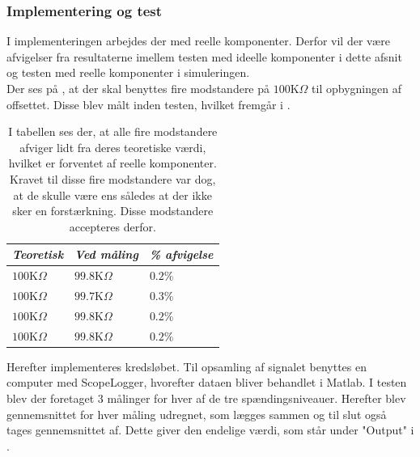 \subsubsection{Implementering og test}
I implementeringen arbejdes der med reelle komponenter. Derfor vil der være afvigelser fra resultaterne imellem testen med ideelle komponenter i dette afsnit og testen med reelle komponenter i simuleringen. \\
Der ses på , at der skal benyttes fire modstandere på $100$K$\Omega$ til opbygningen af offsettet. Disse blev målt inden testen, hvilket fremgår i .
\begin{table}[H]
	\centering
	\begin{tabular}{|l|l|l|}
		\hline
		\textit{Teoretisk} & \textit{Ved måling} & \textit{\% afvigelse} \\ \hline
		$100$K$\Omega$       & $99.8$K$\Omega$       & $0.2$\%               \\ \hline
		$100$K$\Omega$       & $99.7$K$\Omega$       & $0.3$\%               \\ \hline
		$100$K$\Omega$       & $99.8$K$\Omega$       & $0.2$\%               \\ \hline
		$100$K$\Omega$       & $99.8$K$\Omega$       & $0.2$\%               \\ \hline
	\end{tabular}
	\caption{I tabellen ses der, at alle fire modstandere afviger lidt fra deres teoretiske værdi, hvilket er forventet af reelle komponenter. Kravet til disse fire modstandere var dog, at de skulle være ens således at der ikke sker en forstærkning. Disse modstandere accepteres derfor.}
	\label{Tab:modstand_offset}
\end{table}
\noindent Herefter implementeres kredsløbet. Til opsamling af signalet benyttes en computer med ScopeLogger, hvorefter dataen bliver behandlet i Matlab. I testen blev der foretaget 3 målinger for hver af de tre spændingsniveauer. Herefter blev gennemsnittet for hver måling udregnet, som lægges sammen og til slut også tages gennemsnittet af. Dette giver den endelige værdi, som står under "Output" i .

